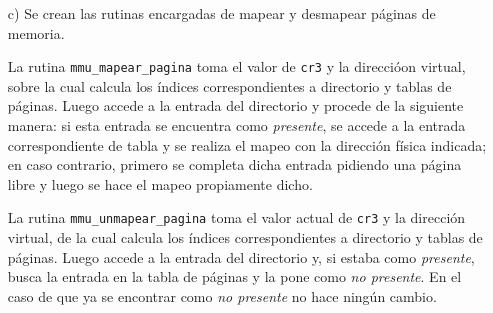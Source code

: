 \begin{enumerate}
\item[c)] Se crean las rutinas encargadas de mapear y desmapear páginas de memoria.

La rutina {\tt mmu\_mapear\_pagina} toma el valor de {\tt cr3} y la direccióon virtual, sobre la cual calcula los índices correspondientes a directorio y tablas de páginas. Luego accede a la entrada del directorio y procede de la siguiente manera: si esta entrada se encuentra como {\it presente}, se accede a la entrada correspondiente de tabla y se realiza el mapeo con la dirección física indicada; en caso contrario, primero se completa dicha entrada pidiendo una página libre y luego se hace el mapeo propiamente dicho.

La rutina {\tt mmu\_unmapear\_pagina} toma el valor actual de {\tt cr3} y la dirección virtual, de la cual calcula los índices correspondientes a directorio y tablas de páginas.  Luego accede a la entrada del directorio y, si estaba como {\it presente}, busca la entrada en la tabla de p\'aginas y la pone como {\it no presente}. En el caso de que ya se encontrar como {\it no presente} no hace ningún cambio.

\end{enumerate}
